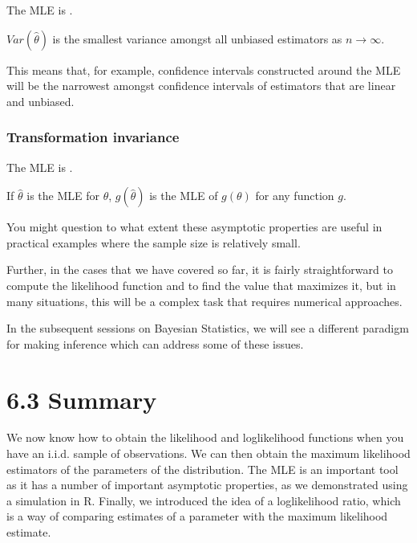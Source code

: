 \documentclass[letterpaper,10pt,english]{jupyterBook}
\begin{document}
\sphinxAtStartPar
The MLE is .

\sphinxAtStartPar
\(Var(\hat{\theta})\) is the smallest variance amongst all unbiased estimators as \(n \rightarrow \infty\).

\sphinxAtStartPar
This means that, for example, confidence intervals constructed around the MLE will be the narrowest amongst confidence intervals of estimators that are linear and unbiased.


\subsubsection*{Transformation invariance}



\sphinxAtStartPar
The MLE is .

\sphinxAtStartPar
If \(\hat{\theta}\) is the MLE for \(\theta\), \(g(\hat{\theta})\) is the MLE of \(g(\theta)\) for any function \(g\).



\sphinxAtStartPar
You might question to what extent these asymptotic properties are useful in practical examples where the sample size is relatively small.

\sphinxAtStartPar
Further, in the cases that we have covered so far, it is fairly straightforward to compute the likelihood function and to find the value that maximizes it, but in many situations, this will be a complex task that requires numerical approaches.

\sphinxAtStartPar
In the subsequent sessions on Bayesian Statistics, we will see a different paradigm for making inference which can address some of these issues.


\section{6.3 Summary}
\label{\detokenize{06.d. Maximum Likelihood:summary}}\label{\detokenize{06.d. Maximum Likelihood::doc}}
\sphinxAtStartPar
We now know how to obtain the likelihood and log\sphinxhyphen{}likelihood functions when you have an i.i.d. sample of observations. We can then obtain the maximum likelihood estimators of the parameters of the distribution. The MLE is an important tool as it has a number of important asymptotic properties, as we demonstrated using a simulation in R. Finally, we introduced the idea of a log\sphinxhyphen{}likelihood ratio, which is a way of comparing estimates of a parameter with the maximum likelihood estimate.
\end{document}
